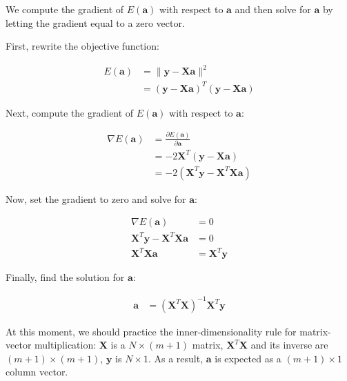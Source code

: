 \documentclass[12pt]{article}
\begin{document}
We compute the gradient of \(E(\mathbf{a})\) with respect to \(\mathbf{a}\) and then solve for \(\mathbf{a}\) by letting the gradient equal to a zero vector. 

First, rewrite the objective function:

\begin{equation}
\begin{split}
E(\mathbf{a}) &= \|\mathbf{y} - \mathbf{Xa} \|^2 \\
              &= (\mathbf{y} - \mathbf{Xa})^T(\mathbf{y} - \mathbf{Xa})
\end{split}
\label{p03t08eq11}
\end{equation}

Next, compute the gradient of \(E(\mathbf{a})\) with respect to \(\mathbf{a}\):

\begin{equation}
\begin{aligned}
\nabla E(\mathbf{a}) &= \frac{\partial E(\mathbf{a})}{\partial \mathbf{a}} \\
                     &= -2\mathbf{X}^T(\mathbf{y} - \mathbf{Xa})  \\
                     &= -2\left( \mathbf{X}^T \mathbf{y} -  \mathbf{X}^T \mathbf{Xa} \right)
\end{aligned}
\label{p03t08eq12}
\end{equation}

Now, set the gradient to zero and solve for \(\mathbf{a}\):

\begin{equation}
\begin{aligned}
\nabla E(\mathbf{a}) &= 0 \\
\mathbf{X}^T \mathbf{y} -  \mathbf{X}^T \mathbf{Xa}  & = 0 \\
\mathbf{X}^T \mathbf{Xa}  &= \mathbf{X}^T \mathbf{y}
\end{aligned}
\label{p03t08eq13}
\end{equation}

Finally, find the solution for \(\mathbf{a}\):

\begin{equation}
\begin{aligned}
\mathbf{a} &= (\mathbf{X}^T\mathbf{X})^{-1}\mathbf{X}^T\mathbf{y}
\end{aligned}
\label{p03t08eq14}
\end{equation}

At this moment, we should practice the inner-dimensionality rule for matrix-vector multiplication: $\mathbf{X}$ is a $N\times (m+1)$ matrix, $\mathbf{X}^T \mathbf{X}$ and its inverse are $(m+1) \times (m+1)$, $\mathbf{y}$ is $N\times 1$. As a result, $\mathbf{a}$ is expected as a $(m+1) \times 1$ column vector.
\end{document}
